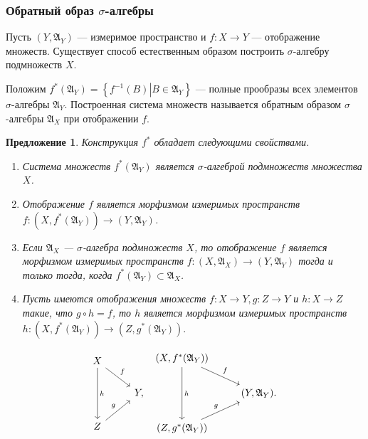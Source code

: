\documentclass[12pt]{article}
\newtheorem{proposition}[theorem]{Предложение}
\numberwithin{theorem}{section}
\theoremstyle{definition}
\newcommand{\defin}[2]{\hypertarget{#2}{{\color{red} #1}}}
\newcommand{\setsigmaalg}{\mathfrak{A}}
\newcommand{\defineset}[2]{\left\{
	\left.
	#1
	\right\vert
	#2
	\right\}}
\begin{document}
	\subsubsection{Обратный образ $ \sigma $-алгебры}
	
	Пусть $ (Y, \setsigmaalg_Y) $ --- измеримое пространство и $ f \colon X \to Y $ --- отображение множеств.
	Существует способ естественным образом построить $ \sigma $-алгебру подмножеств $ X $.
	
	Положим $ f^{*}(\setsigmaalg_Y) = \defineset{f^{-1}(B)}{B \in \setsigmaalg_Y} $ --- 
	полные прообразы всех элементов $ \sigma $-алгебры $ \setsigmaalg_Y $.
	Построенная система множеств называется \defin{обратным образом}{inverse-image-of-sigma-algebra} 
	$ \sigma $-алгебры $ \setsigmaalg_X $ при отображении $ f $.
	
	\begin{proposition} \label{inverse image of sigma algebra}
		Конструкция $ f^{*} $ обладает следующими свойствами.
		\begin{enumerate}
			\item Система множеств $ f^{*}(\setsigmaalg_Y) $ является $ \sigma $-алгеброй подмножеств множества $ X $.
			\item Отображение $ f $ является морфизмом измеримых пространств $ f \colon (X, f^{*}(\setsigmaalg_Y)) \to (Y, \setsigmaalg_Y) $.
			\item Если $ \setsigmaalg_X $ --- $ \sigma $-алгебра подмножеств $ X $,
			то отображение $ f $ является морфизмом измеримых пространств $ f \colon (X, \setsigmaalg_X) \to (Y, \setsigmaalg_Y) $
			тогда и только тогда, когда $ f^{*}(\setsigmaalg_Y) \subset \setsigmaalg_X $.
			\item Пусть имеются отображения множеств $ f \colon X \to Y, g \colon Z \to Y $ и $ h \colon X \to Z $
			такие, что $ g \circ h = f $, то $ h $ является морфизмом измеримых пространств
			$ h \colon (X, f^{*}(\setsigmaalg_Y)) \to (Z, g^{*}(\setsigmaalg_Y)). $
		\end{enumerate}
		$$ \begin{tikzcd}
			X \ar{dd}{h} \ar{dr}{f} & \\
			& Y, \\
			Z \ar{ur}{g} & \\
		\end{tikzcd} \
		\begin{tikzcd}
			(X, f^{*}(\setsigmaalg_Y)) \ar{dd}{h} \ar{dr}{f} & \\
			 & (Y, \setsigmaalg_Y).  \\
			(Z, g^{*}(\setsigmaalg_Y)) \ar{ur}{g} &  \\
		\end{tikzcd} $$
	\end{proposition}
	
\end{document}
